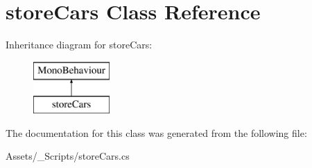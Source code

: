 \hypertarget{classstore_cars}{}\section{store\+Cars Class Reference}
\label{classstore_cars}
Inheritance diagram for store\+Cars\+:\begin{figure}[H]
\begin{center}
\leavevmode
\includegraphics[height=2.000000cm]{classstore_cars}
\end{center}
\end{figure}


The documentation for this class was generated from the following file\+:\begin{DoxyCompactItemize}
\item 
Assets/\+\_\+\+Scripts/store\+Cars.\+cs\end{DoxyCompactItemize}
